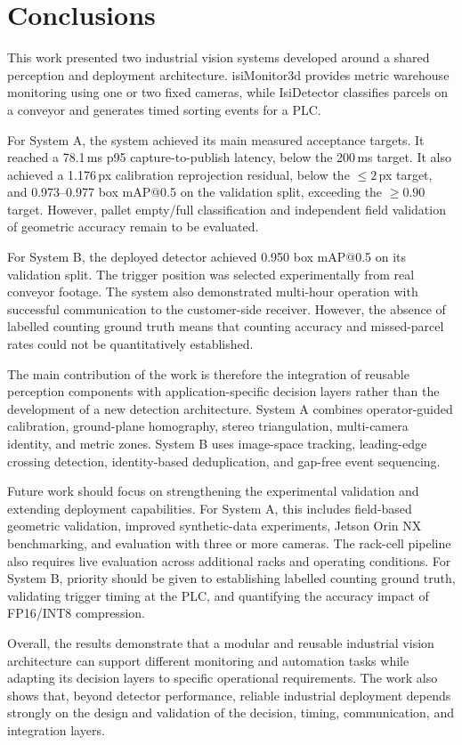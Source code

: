 \documentclass[9pt,a4paper,twocolumn]{rho-class/rho}
\begin{document}
\section{Conclusions}

This work presented two industrial vision systems developed around a shared perception and deployment architecture. isiMonitor3d provides metric warehouse monitoring using one or two fixed cameras, while IsiDetector classifies parcels on a conveyor and generates timed sorting events for a PLC.

For System A, the system achieved its main measured acceptance targets. It reached a 78.1\,ms p95 capture-to-publish latency, below the 200\,ms target. It also achieved a 1.176\,px calibration reprojection residual, below the $\leq 2$\,px target, and 0.973--0.977 box mAP@0.5 on the validation split, exceeding the $\geq 0.90$ target. However, pallet empty/full classification and independent field validation of geometric accuracy remain to be evaluated.

For System B, the deployed detector achieved 0.950 box mAP@0.5 on its validation split. The trigger position was selected experimentally from real conveyor footage. The system also demonstrated multi-hour operation with successful communication to the customer-side receiver. However, the absence of labelled counting ground truth means that counting accuracy and missed-parcel rates could not be quantitatively established.

The main contribution of the work is therefore the integration of reusable perception components with application-specific decision layers rather than the development of a new detection architecture. System A combines operator-guided calibration, ground-plane homography, stereo triangulation, multi-camera identity, and metric zones. System B uses image-space tracking, leading-edge crossing detection, identity-based deduplication, and gap-free event sequencing.

Future work should focus on strengthening the experimental validation and extending deployment capabilities. For System A, this includes field-based geometric validation, improved synthetic-data experiments, Jetson Orin NX benchmarking, and evaluation with three or more cameras. The rack-cell pipeline also requires live evaluation across additional racks and operating conditions. For System B, priority should be given to establishing labelled counting ground truth, validating trigger timing at the PLC, and quantifying the accuracy impact of FP16/INT8 compression.

Overall, the results demonstrate that a modular and reusable industrial vision architecture can support different monitoring and automation tasks while adapting its decision layers to specific operational requirements. The work also shows that, beyond detector performance, reliable industrial deployment depends strongly on the design and validation of the decision, timing, communication, and integration layers.

\printbibliography

\end{document}
